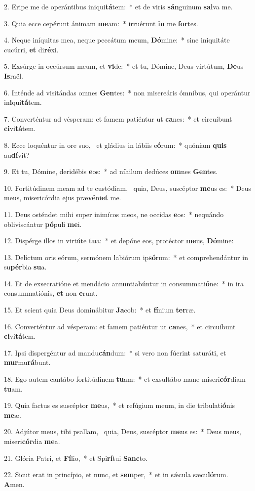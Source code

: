 2. Eripe me de operántibus iniqui\textbf{tá}tem:~*  et de viris \textbf{sán}guinum \textbf{sal}va me.\

3. Quia ecce cepérunt ánimam \textbf{me}am:~*  irruérunt \textbf{in} me \textbf{for}tes.\

4. Neque iníquitas mea, neque peccátum meum, \textbf{Dó}mine:~*  sine iniquitáte cucúrri, \textbf{et} di\textbf{ré}xi.\

5. Exsúrge in occúrsum meum, et \textbf{vi}de:~*  et tu, Dómine, Deus virtútum, \textbf{De}us \textbf{Is}raël.\

6. Inténde ad visitándas omnes \textbf{Gen}tes:~*  non misereáris ómnibus, qui operántur in\textbf{i}qui\textbf{tá}tem.\

7. Converténtur ad vésperam: et famem patiéntur ut \textbf{ca}nes:~*  et circuíbunt \textbf{ci}vi\textbf{tá}tem.\

8. Ecce loquéntur in ore suo, \dag\  et gládius in lábiis e\textbf{ó}rum:~*  quóniam \textbf{quis} au\textbf{dí}vit?\

9. Et tu, Dómine, deridébis \textbf{e}os:~*  ad níhilum dedúces \textbf{om}nes \textbf{Gen}tes.\

10. Fortitúdinem meam ad te custódiam, \dag\  quia, Deus, suscéptor \textbf{me}us es:~*  Deus meus, misericórdia ejus præ\textbf{vé}ni\textbf{et} me.\

11. Deus osténdet mihi super inimícos meos, ne occídas \textbf{e}os:~*  nequándo obliviscántur \textbf{pó}puli \textbf{me}i.\

12. Dispérge illos in virtúte \textbf{tu}a:~*  et depóne eos, protéctor \textbf{me}us, \textbf{Dó}mine:\

13. Delíctum oris eórum, sermónem labiórum ip\textbf{só}rum:~*  et comprehendántur in su\textbf{pér}bia \textbf{su}a.\

14. Et de exsecratióne et mendácio annuntiabúntur in consummati\textbf{ó}ne:~*  in ira consummatiónis, \textbf{et} non \textbf{e}runt.\

15. Et scient quia Deus dominábitur \textbf{Ja}cob:~*  et \textbf{fí}nium \textbf{ter}ræ.\

16. Converténtur ad vésperam: et famem patiéntur ut \textbf{ca}nes,~*  et circuíbunt \textbf{ci}vi\textbf{tá}tem.\

17. Ipsi dispergéntur ad mandu\textbf{cán}dum:~*  si vero non fúerint saturáti, et \textbf{mur}mu\textbf{rá}bunt.\

18. Ego autem cantábo fortitúdinem \textbf{tu}am:~*  et exsultábo mane miseri\textbf{cór}diam \textbf{tu}am.\

19. Quia factus es suscéptor \textbf{me}us,~*  et refúgium meum, in die tribulati\textbf{ó}nis \textbf{me}æ.\

20. Adjútor meus, tibi psallam, \dag\  quia, Deus, suscéptor \textbf{me}us es:~*  Deus meus, miseri\textbf{cór}dia \textbf{me}a.\

21. Glória Patri, et \textbf{Fí}lio,~*  et Spi\textbf{rí}tui \textbf{Sanc}to.\

22. Sicut erat in princípio, et nunc, et \textbf{sem}per,~*  et in sǽcula sæcu\textbf{ló}rum. \textbf{A}men.\

